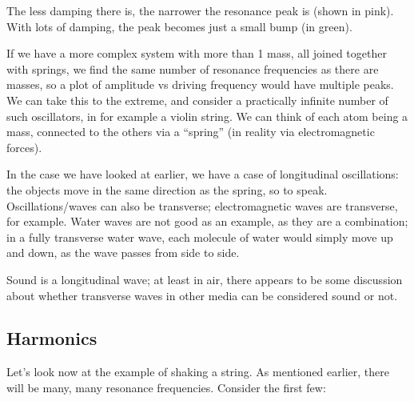 The less damping there is, the narrower the resonance peak is (shown in pink). With lots of damping, the peak becomes just a small bump (in green).

If we have a more complex system with more than 1 mass, all joined together with springs, we find the same number of resonance frequencies as there are masses, so a plot of amplitude vs driving frequency would have multiple peaks.\\
We can take this to the extreme, and consider a practically infinite number of such oscillators, in for example a violin string. We can think of each atom being a mass, connected to the others via a ``spring'' (in reality via electromagnetic forces).

In the case we have looked at earlier, we have a case of longitudinal oscillations: the objects move in the same direction as the spring, so to speak.\\
Oscillations/waves can also be transverse; electromagnetic waves are transverse, for example. Water waves are not good as an example, as they are a combination; in a fully transverse water wave, each molecule of water would simply move up and down, as the wave passes from side to side.

Sound is a longitudinal wave; at least in air, there appears to be some discussion about whether transverse waves in other media can be considered sound or not.

\subsection{Harmonics}

Let's look now at the example of shaking a string. As mentioned earlier, there will be many, many resonance frequencies. Consider the first few:

\begin{figure}[H]
  \centering
{}
\end{figure}


